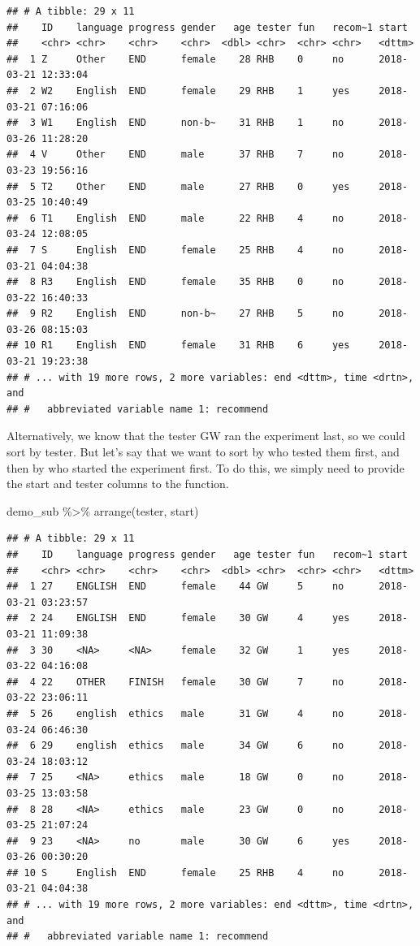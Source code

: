 \documentclass[
]{book}
\newenvironment{Shaded}{\begin{snugshade}}{\end{snugshade}}
\newcommand{\FunctionTok}[1]{\textcolor[rgb]{0.00,0.00,0.00}{#1}}
\newcommand{\NormalTok}[1]{#1}
\newcommand{\SpecialCharTok}[1]{\textcolor[rgb]{0.00,0.00,0.00}{#1}}
\begin{document}
\begin{verbatim}
## # A tibble: 29 x 11
##    ID    language progress gender   age tester fun   recom~1 start              
##    <chr> <chr>    <chr>    <chr>  <dbl> <chr>  <chr> <chr>   <dttm>             
##  1 Z     Other    END      female    28 RHB    0     no      2018-03-21 12:33:04
##  2 W2    English  END      female    29 RHB    1     yes     2018-03-21 07:16:06
##  3 W1    English  END      non-b~    31 RHB    1     no      2018-03-26 11:28:20
##  4 V     Other    END      male      37 RHB    7     no      2018-03-23 19:56:16
##  5 T2    Other    END      male      27 RHB    0     yes     2018-03-25 10:40:49
##  6 T1    English  END      male      22 RHB    4     no      2018-03-24 12:08:05
##  7 S     English  END      female    25 RHB    4     no      2018-03-21 04:04:38
##  8 R3    English  END      female    35 RHB    0     no      2018-03-22 16:40:33
##  9 R2    English  END      non-b~    27 RHB    5     no      2018-03-26 08:15:03
## 10 R1    English  END      female    31 RHB    6     yes     2018-03-21 19:23:38
## # ... with 19 more rows, 2 more variables: end <dttm>, time <drtn>, and
## #   abbreviated variable name 1: recommend
\end{verbatim}

Alternatively, we know that the tester GW ran the experiment last, so we could sort by tester. But let's say that we want to sort by who tested them first, and then by who started the experiment first. To do this, we simply need to provide the start and tester columns to the function.

\begin{Shaded}
\begin{Highlighting}[]
\NormalTok{demo\_sub }\SpecialCharTok{\%\textgreater{}\%} \FunctionTok{arrange}\NormalTok{(tester, start)}
\end{Highlighting}
\end{Shaded}

\begin{verbatim}
## # A tibble: 29 x 11
##    ID    language progress gender   age tester fun   recom~1 start              
##    <chr> <chr>    <chr>    <chr>  <dbl> <chr>  <chr> <chr>   <dttm>             
##  1 27    ENGLISH  END      female    44 GW     5     no      2018-03-21 03:23:57
##  2 24    ENGLISH  END      female    30 GW     4     yes     2018-03-21 11:09:38
##  3 30    <NA>     <NA>     female    32 GW     1     yes     2018-03-22 04:16:08
##  4 22    OTHER    FINISH   female    30 GW     7     no      2018-03-22 23:06:11
##  5 26    english  ethics   male      31 GW     4     no      2018-03-24 06:46:30
##  6 29    english  ethics   male      34 GW     6     no      2018-03-24 18:03:12
##  7 25    <NA>     ethics   male      18 GW     0     no      2018-03-25 13:03:58
##  8 28    <NA>     ethics   male      23 GW     0     no      2018-03-25 21:07:24
##  9 23    <NA>     no       male      30 GW     6     yes     2018-03-26 00:30:20
## 10 S     English  END      female    25 RHB    4     no      2018-03-21 04:04:38
## # ... with 19 more rows, 2 more variables: end <dttm>, time <drtn>, and
## #   abbreviated variable name 1: recommend
\end{verbatim}
\end{document}
